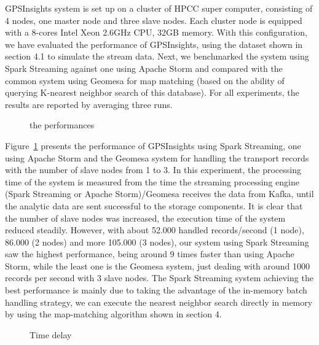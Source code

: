 \documentclass{acm_proc_article-sp}
\begin{document}
GPSInsights system is set up on a cluster of HPCC super computer, consisting of 4 nodes, one master node and three slave nodes. Each cluster node is equipped with a  8-cores Intel Xeon 2.6GHz CPU, 32GB memory. With this configuration, we have evaluated the performance of GPSInsights, using the dataset shown in section 4.1 to simulate the stream data. Next, we benchmarked the system using Spark Streaming against one using Apache Storm and compared with the common system using Geomesa for map matching (based on the ability of querying K-nearest neighbor search of this database). For all experiments, the results are reported by averaging three runs. 
	
	
	\begin{figure}[h]
		\centering
		\caption{the performances}
		\label{fig:performance}
	\end{figure}

Figure~\ref{fig:performance} presents the performance of GPSInsights using Spark Streaming, one using Apache Storm and the Geomesa system for handling the transport records with the number of slave nodes from 1 to 3. In this experiment, the processing time of the system is measured from the time the streaming processing engine (Spark Streaming or Apache Storm)/Geomesa receives the data from Kafka, until the analytic data  are sent successful to the storage components. It is clear that the number of slave nodes was increased, the execution time of the system reduced steadily. However, with about 52.000 handled records/second (1 node), 86.000 (2 nodes) and more 105.000 (3 nodes), our system using Spark Streaming saw the highest performance, being around 9 times faster than using Apache Storm, while the least one is the Geomesa system, just dealing with around 1000 records per second with 3 slave nodes. The Spark Streaming system achieving the best performance is mainly due to taking the advantage of the in-memory batch handling strategy, we can execute the nearest neighbor search directly in memory by using the map-matching algorithm shown in section 4.

	\begin{figure}[h]
		\centering
		\caption{Time delay}
		\label{fig:timedelay}
	\end{figure}
	
\end{document}
